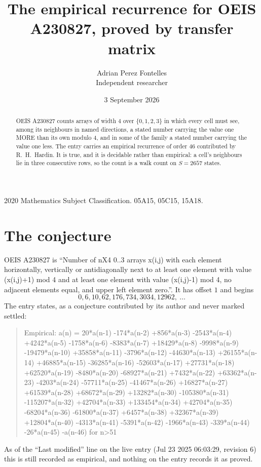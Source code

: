 \documentclass[11pt,a4paper]{article}
\title{The empirical recurrence for OEIS A230827, proved by transfer matrix}
\author{Adrian Perez Fontelles\\ \small Independent researcher}
\date{3 September 2026}
\theoremstyle{plain}
\theoremstyle{definition}
\begin{document}
\maketitle

\begin{abstract}
OEIS A230827 counts arrays of width $4$ over $\{0,1,2,3\}$ in which every cell must see, among its
neighbours in named directions, a stated number carrying the value one MORE than its own
modulo $4$, and in some of the family a stated number carrying the value one less. The entry
carries an empirical recurrence of order $46$ contributed by R.~H.~Hardin. It is true, and
it is decidable rather than empirical: a cell's neighbours lie in three consecutive rows, so
the count is a walk count on $S=2657$ states.
\end{abstract}

\noindent\small 2020 Mathematics Subject Classification. 05A15, 05C15, 15A18.\normalsize

\section{The conjecture}

OEIS A230827 is ``Number of nX4 0..3 arrays x(i,j) with each element horizontally, vertically or antidiagonally next to at least one element with value (x(i,j)+1) mod 4 and at least one element with value (x(i,j)-1) mod 4, no adjacent elements equal, and upper left element zero.''. It has offset $1$ and begins
\[
0, 6, 10, 62, 176, 734, 3034, 12962,\ \dots
\]
The entry states, as a conjecture contributed by its author and never marked settled:
\begin{quote}
Empirical: a(n) = 20*a(n-1) -174*a(n-2) +856*a(n-3) -2543*a(n-4) +4242*a(n-5) -1758*a(n-6) -8383*a(n-7) +18429*a(n-8) -9998*a(n-9) -19479*a(n-10) +35858*a(n-11) -3796*a(n-12) -44630*a(n-13) +26155*a(n-14) +46885*a(n-15) -36285*a(n-16) -52603*a(n-17) +27731*a(n-18) +62520*a(n-19) -8480*a(n-20) -68927*a(n-21) +7432*a(n-22) +63362*a(n-23) -4203*a(n-24) -57711*a(n-25) -41467*a(n-26) +16827*a(n-27) +61539*a(n-28) +68672*a(n-29) +13282*a(n-30) -105380*a(n-31) -115207*a(n-32) +42704*a(n-33) +133454*a(n-34) +42704*a(n-35) -68204*a(n-36) -61800*a(n-37) +6457*a(n-38) +32367*a(n-39) +12804*a(n-40) -4313*a(n-41) -5391*a(n-42) -1966*a(n-43) -339*a(n-44) -26*a(n-45) -a(n-46) for n>51
\end{quote}
As of the ``Last modified'' line on the live entry (Jul 23 2025 06:03:29, revision 6) this is still
recorded as empirical, and nothing on the entry records it as proved.
\end{document}
